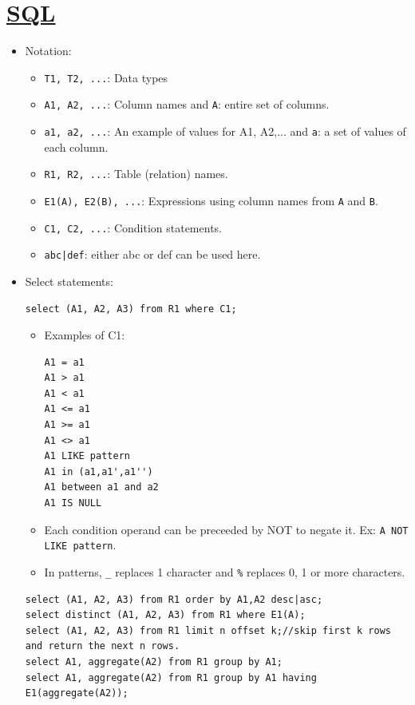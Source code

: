 \documentclass{report}
\begin{document}
\section{\href{https://www.sqltutorial.org/sql-cheat-sheet/}{SQL}}
\begin{itemize}
\item Notation:
\begin{itemize}
    \item \texttt{T1, T2, ...}: Data types
    \item \texttt{A1, A2, ...}: Column names and \texttt{A}: entire set of columns.
    \item \texttt{a1, a2, ...}: An example of values for A1, A2,... and \texttt{a}: a set of values of each column.
    \item \texttt{R1, R2, ...}: Table (relation) names.
    \item \texttt{E1(A), E2(B), ...}: Expressions using column names from \texttt{A} and \texttt{B}.
    \item \texttt{C1, C2, ...}: Condition statements.
    \item \texttt{abc|def}: either abc or def can be used here.
\end{itemize}
\item Select statements:
\begin{lstlisting}[caption=The Usual]
select (A1, A2, A3) from R1 where C1;
\end{lstlisting}
\begin{itemize}
\item Examples of C1:
\begin{lstlisting}
A1 = a1
A1 > a1
A1 < a1
A1 <= a1
A1 >= a1
A1 <> a1
A1 LIKE pattern
A1 in (a1,a1',a1'')
A1 between a1 and a2
A1 IS NULL
\end{lstlisting}
\item Each condition operand can be preceeded by NOT to negate it. Ex: \texttt{A NOT LIKE pattern}.
\item In patterns, \texttt{\_} replaces 1 character and \texttt{\%} replaces 0, 1 or more characters.
\end{itemize}
\begin{lstlisting}[caption=Variations of Select]
select (A1, A2, A3) from R1 order by A1,A2 desc|asc;
select distinct (A1, A2, A3) from R1 where E1(A);
select (A1, A2, A3) from R1 limit n offset k;//skip first k rows and return the next n rows.
select A1, aggregate(A2) from R1 group by A1;
select A1, aggregate(A2) from R1 group by A1 having E1(aggregate(A2));
\end{lstlisting}

\end{itemize}
\end{document}
